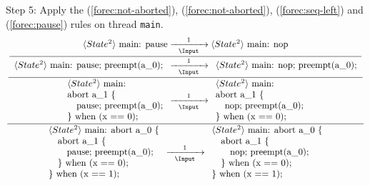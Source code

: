 \noindent
Step 5: Apply the (\ref{forec:not-aborted}), (\ref{forec:not-aborted}), (\ref{forec:seq-left}) and 
(\ref{forec:pause}) rules on thread \verb$main$.
\begin{equation*}
	\frac{
		\dfrac{
			\dfrac{
					\langle State^2 \rangle ~ \text{main: pause}
						\xrightarrow[~~\Input~~]{1}
					\langle State^2 \rangle ~ \text{main: nop}
				}{
					\begin{array}{l}
						\langle State^2 \rangle ~ \text{main: pause; preempt(a\_0);}				
					\end{array}
						\xrightarrow[~~\Input~~]{1} 
					\begin{array}{l}
						\langle State^2 \rangle ~ \text{main: nop; preempt(a\_0);}				
					\end{array}
				}
			}{
				\begin{array}{l}
					\langle State^2 \rangle ~ \text{main:}		\\
					\text{abort a\_1 \{}						\\
					\text{~~~pause; preempt(a\_0);}				\\
					\text{\} when (x == 0);}					
				\end{array}
					\xrightarrow[~~\Input~~]{1} 
				\begin{array}{l}
					\langle State^2 \rangle ~ \text{main:}		\\
					\text{abort a\_1 \{}						\\
					\text{~~~nop; preempt(a\_0);}				\\
					\text{\} when (x == 0);}					
				\end{array}
			}
		}{
			\begin{array}{l}
				\langle State^2 \rangle ~ \text{main: abort a\_0 \{}	\\
				\text{~~~abort a\_1 \{}									\\
				\text{~~~~~~pause; preempt(a\_0);}						\\
				\text{~~~\} when (x == 0);}								\\
				\text{\} when (x == 1);}
			\end{array}
				\xrightarrow[~~\Input~~]{1} 
			\begin{array}{l}
				\langle State^2 \rangle ~ \text{main: abort a\_0 \{}\\
				\text{~~~abort a\_1 \{}								\\
				\text{~~~~~~nop; preempt(a\_0);}					\\
				\text{~~~\} when (x == 0);}							\\
				\text{\} when (x == 1);}
			\end{array}
		}
\end{equation*}

